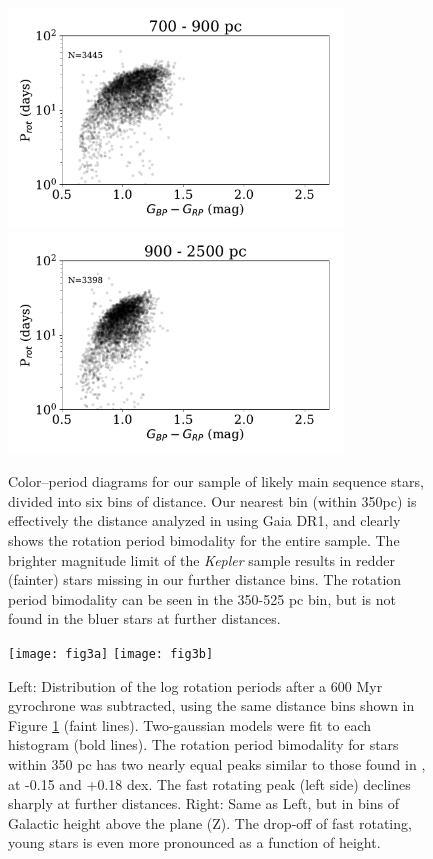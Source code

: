 \documentclass[preprint2]{aastex62}
\newcommand{\Kepler}{\textsl{Kepler}\xspace}
\begin{document}
\begin{figure}[]
\includegraphics[width=3.5in]{fig2e}
\includegraphics[width=3.5in]{fig2f}
\caption{Color--period diagrams for our sample of likely main sequence stars, divided into six bins of distance. Our nearest bin (within 350pc) is effectively the distance analyzed in \citet{davenport2017} using Gaia DR1, and clearly shows the rotation period bimodality for the entire sample. The brighter magnitude limit of the \Kepler sample results in redder (fainter) stars missing in our further distance bins. The rotation period bimodality can be seen in the 350-525 pc bin, but is not found in the bluer stars at further distances.
}
\label{fig:color_period}
\end{figure}



\begin{figure}[!ht]
\centering
\texttt{[image: fig3a]}
\texttt{[image: fig3b]}
\caption{Left: Distribution of the log rotation periods after a 600 Myr gyrochrone was subtracted, using the same distance bins shown in Figure \ref{fig:color_period} (faint lines). Two-gaussian models were fit to each histogram (bold lines). 
The rotation period bimodality for stars within 350 pc has two nearly equal peaks similar to those found in \citet{davenport2017}, at -0.15 and +0.18 dex. The fast rotating peak (left side) declines sharply at further distances.
Right: Same as Left, but in bins of Galactic height above the plane (Z). The drop-off of fast rotating, young stars is even more pronounced as a function of height.
}
\label{fig:per_hist}
\end{figure}
\end{document}
